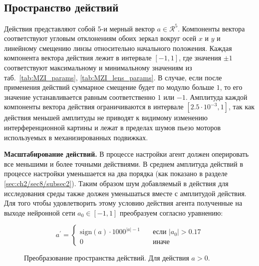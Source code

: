 \subsection{Пространство действий}

Действия представляют собой 5-и мерный вектор $a \in \mathcal{R}^5$. Компоненты вектора соответствуют угловым отклонениям обоих зеркал вокруг осей $x$ и $y$ и линейному смещению линзы относительно начального положения. Каждая компонента вектора действия лежит в интервале $[-1,1]$, где значения $\pm 1$ соответствуют максимальному и минимальному значениям из таб.~\ref{tab:MZI_params}, \ref{tab:MZI_lens_params}. В случае, если после применения действий суммарное смещение будет по модулю больше $1$, то его значение устанавливается равным соответственно $1$ или $-1$.
Амплитуда каждой компоненты вектора действия ограничиваются в интервале $[2.5 \cdot 10^{-3}, 1]$, так как действия меньшей амплитуды не приводят к видимому изменению интерференционной картины и лежат в пределах шумов пьезо моторов используемых в механизированных подвижках.

\textbf{Масштабирование действий.} 
В процессе настройки агент должен оперировать все меньшими и более точными действиями. В среднем амплитуда действий в процессе настройки уменьшается на два порядка (как показано в разделе \ref{sec:ch2/sec8/subsec2}). Таким образом шум добавляемый в действия для исследования среды также должен уменьшаться вместе с амплитудой действия. Для того чтобы удовлетворить этому условию действия агента полученные на выходе нейронной сети  $a_0\in[-1,1]$ преобразуем согласно уравнению:

\begin{equation}
a^{\prime} =
   \begin{cases}
    {\mathrm{sign}}(a) \cdot 1000^{|a| - 1}  & \quad \text{если $|a_0| > 0.17$} 
    \\
    0  & \quad \text{иначе}
  \end{cases}
\label{eq:rescale}
\end{equation}

\begin{figure}[ht]
\caption{Преобразование пространства действий. Для действия $a > 0$.}
\label{fig:rescale}
\end{figure}

